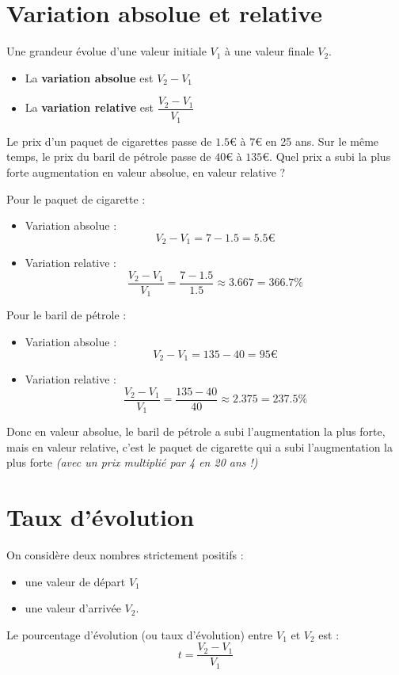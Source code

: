 \section{Variation absolue et relative}

\begin{defi}{}{}
Une grandeur évolue d'une valeur initiale $V_{1}$ à une valeur finale $V_{2}$.
\begin{itemize}
\item[-]La \textbf{variation absolue} est $V_{2}-V_{1}$
\item[-]La \textbf{variation relative} est $\dfrac{V_{2}-V_{1}}{V_{1}}$
\end{itemize}
\end{defi}

\begin{ex}{}{}
Le prix d'un paquet de cigarettes passe de $1.5$€ à $7$€ en 25 ans.
Sur le même temps, le prix du baril de pétrole passe de $40$€ à $135$€.
Quel prix a subi la plus forte augmentation en valeur absolue, en valeur relative ?
\bigbreak

Pour le paquet de cigarette :
\begin{itemize}
\item[-]Variation absolue : 
\[V_{2}-V_{1} = 7 - 1.5 = 5.5\text{€}\]
\item[-]Variation relative :
\[\frac{V_{2}-V_{1}}{V_{1}} = \frac{7-1.5}{1.5} \approx 3.667 = 366.7\%\]
\end{itemize}

Pour le baril de pétrole :
\begin{itemize}
\item[-]Variation absolue : 
\[V_{2}-V_{1} = 135 - 40 = 95\text{€}\]
\item[-]Variation relative :
\[\frac{V_{2}-V_{1}}{V_{1}} = \frac{135-40}{40} \approx 2.375 = 237.5\%\]
\end{itemize}

Donc en valeur absolue, le baril de pétrole a subi l'augmentation la plus forte, mais en valeur relative, c'est le paquet de cigarette qui a subi l'augmentation la plus forte \textit{(avec un prix multiplié par 4 en 20 ans !)}
\end{ex}

\section{Taux d'évolution}

\begin{defi}{}{}
On considère deux nombres strictement positifs :
\begin{itemize}
\item[-]une valeur de départ $V_{1}$ 
\item[-]une valeur d'arrivée $V_{2}$.
\end{itemize}
Le pourcentage d'évolution (ou taux d'évolution) entre  $V_{1}$ et  $V_{2}$ est :
\[t = \frac{V_{2}-V_{1}}{V_{1}}\]
\end{defi}

